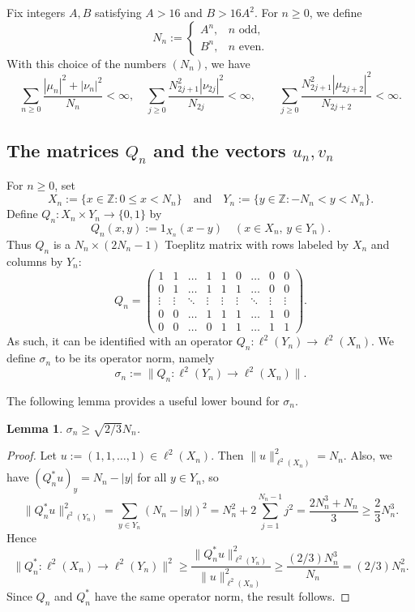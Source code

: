 \documentclass[11pt,reqno]{amsart}
\theoremstyle{plain}
\newtheorem{lemma}[theorem]{Lemma}
\theoremstyle{definition}
\theoremstyle{remark}
\newcommand{\ZZ}{\mathbb{Z}}
\begin{document}
Fix integers $A,B$ satisfying $A>16$ and $B>16A^2$.
For $n\ge0$, we define
\[
N_n:=
\begin{cases}
A^n, &n \text{~odd},\\
B^n, &n \text{~even}.
\end{cases}
\]
With this choice of the numbers $(N_n)$, we have
\begin{equation}\label{E:seriesconv}
\sum_{n\ge0}\frac{|\mu_n|^2+|\nu_n|^2}{N_n}<\infty,
\quad
\sum_{j\ge0}\frac{N_{2j+1}^2|\nu_{2j}|^2}{N_{2j}}<\infty,
\qquad
\sum_{j\ge0}\frac{N_{2j+1}^2|\mu_{2j+2}|^2}{N_{2j+2}}<\infty.
\end{equation}


\subsection{The matrices $Q_n$ and the vectors $u_n,v_n$}
For $n\ge0$, set
\[
X_n:=\{x\in\ZZ: 0\le x<N_n\}
\quad\text{and}\quad
Y_n:=\{y\in\ZZ: -N_n<y<N_n\}.
\]
Define $Q_n:X_n\times Y_n\to\{0,1\}$ by
\[
Q_n(x,y):=1_{X_n}(x-y)
\quad(x\in X_n,\,y\in Y_n).
\]
Thus $Q_n$ is a $N_n\times (2N_n-1)$ Toeplitz matrix with rows labeled by $X_n$ and columns by $Y_n$:
\[
Q_n=
\begin{pmatrix}
1 &1  &\dots &1 &1 &0 &\dots  &0 &0\\
0 &1  &\dots &1 &1 &1 &\dots &0 &0 \\
\vdots&\vdots  &\ddots &\vdots &\vdots &\vdots &\ddots &\vdots &\vdots\\
0 &0 &\dots &1 &1 &1 &\dots &1 &0\\
0 &0 &\dots &0 &1 &1 &\dots &1 &1
\end{pmatrix}.
\]
As such, it can be identified
with an operator $Q_n:\ell^2(Y_n)\to\ell^2(X_n)$.
We define $\sigma_n$ to be its operator norm, namely
\[
\sigma_n:=\|Q_n:\ell^2(Y_n)\to\ell^2(X_n)\|.
\]

The following lemma provides a useful lower bound for $\sigma_n$.
 
\begin{lemma}\label{L:sigmabound}
$\sigma_n\ge \sqrt{2/3}N_n$.
\end{lemma}

\begin{proof}
Let $u:=(1,1,\dots,1)\in\ell^2(X_n)$. Then $\|u\|_{\ell^2(X_n)}^2=N_n$.
Also, we have
$(Q_n^*u)_y=N_n-|y|$ for all $y\in Y_n$,
so
\[
\|Q_n^*u\|_{\ell^2(Y_n)}^2
=\sum_{y\in Y_n}(N_n-|y|)^2
=N_n^2+2\sum_{j=1}^{N_n-1}j^2
=\frac{2N_n^3+N_n}{3}
\ge\frac{2}{3}N_n^3.
\]
Hence 
\[
\|Q^*_n:\ell^2(X_n)\to\ell^2(Y_n)\|^2
\ge\frac{\|Q_n^*u\|_{\ell^2(Y_n)}^2}{\|u\|_{\ell^2(X_n)}^2}
\ge \frac{(2/3)N_n^3}{N_n}=(2/3)N_n^2. 
\]
Since $Q_n$ and $Q_n^*$ have the same operator
norm, the result follows.
\end{proof}
\end{document}
